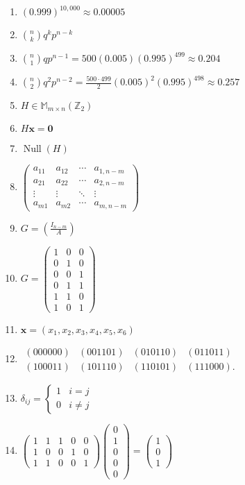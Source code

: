 \documentclass[oneside,10pt,]{article}
\newcommand{\Null}{\operatorname{Null}}
\begin{document}
\begin{enumerate}
\item{}\((0.999)^{10,000} \approx 0.00005\)%
\item{}\(\binom{n}{k} q^kp^{n - k}\)%
\item{}\(\binom{n}{1} qp^{n - 1}= 500(0.005)(0.995)^{499} \approx 0.204\)%
\item{}\(\binom{n}{2} q^{2}p^{n - 2}= \frac{500 \cdot 499}{2}(0.005)^{2}(0.995)^{498} \approx 0.257\)%
\item{}\(H \in {\mathbb M}_{m \times n}({\mathbb Z}_2)\)%
\item{}\(H{\mathbf x} = {\mathbf 0}\)%
\item{}\(\Null(H)\)%
\item{}\(\begin{pmatrix} a_{11} & a_{12} & \cdots & a_{1,n-m} \\ a_{21} & a_{22} & \cdots & a_{2,n-m} \\ \vdots & \vdots & \ddots & \vdots \\ a_{m1} & a_{m2} & \cdots & a_{m,n-m} \end{pmatrix}\)%
\item{}\(G = \left( \frac{I_{n-m}}{A} \right)\)%
\item{}\(G= \begin{pmatrix} 1 & 0 & 0 \\ 0 & 1 & 0 \\ 0 & 0 & 1 \\ 0 & 1 & 1 \\ 1 & 1 & 0 \\ 1 & 0 & 1 \end{pmatrix}\)%
\item{}\({\mathbf x} = (x_1, x_2, x_3, x_4, x_5, x_6)\)%
\item{}\(\begin{array}{cccc} (000000) & (001101) & (010110) & (011011) \\ (100011) & (101110) & (110101) & (111000). \end{array}\)%
\item{}\(\delta_{ij} = \begin{cases} 1 & i = j \\ 0 & i \neq j \end{cases}\)%
\item{}\(\begin{pmatrix} 1 & 1 & 1 & 0 & 0 \\ 1 & 0 & 0 & 1 & 0 \\ 1 & 1 & 0 & 0 & 1 \end{pmatrix} \begin{pmatrix} 0 \\ 1 \\ 0 \\ 0 \\ 0 \end{pmatrix} = \begin{pmatrix} 1 \\ 0 \\ 1 \end{pmatrix}\)%

\end{enumerate}
\end{document}
